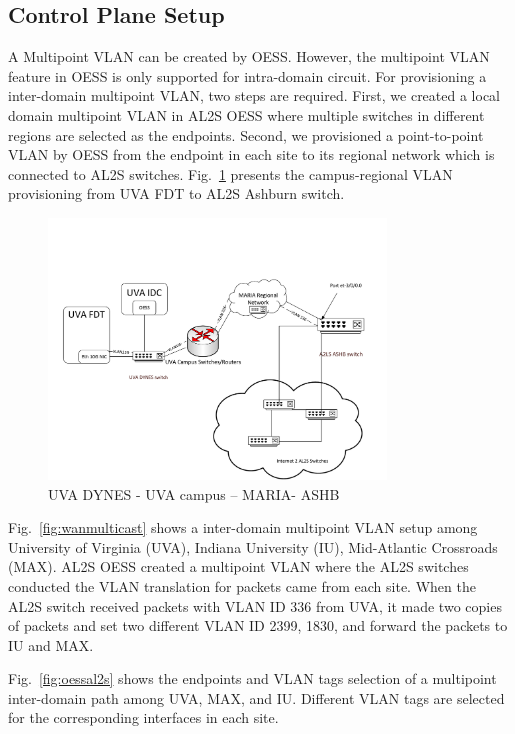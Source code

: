 \subsection{Control Plane Setup}
\label{sec:controlplanefinal}
A Multipoint VLAN can be created by OESS. However, the multipoint VLAN feature in OESS is only supported for intra-domain circuit. For provisioning a inter-domain multipoint VLAN, two steps are required. First, we created a local domain multipoint VLAN in AL2S OESS where multiple switches in different regions are selected as the endpoints. Second, we provisioned a point-to-point VLAN by OESS from the endpoint in each site to its regional network which is connected to AL2S switches. Fig.~\ref{fig:campus-regional} presents the campus-regional VLAN provisioning from UVA FDT to AL2S Ashburn switch.
\begin{figure}[htb!]
\centering
\includegraphics[width=0.8\textwidth]{figures/UVA-ASHB.pdf}
\caption{UVA DYNES - UVA campus – MARIA- ASHB}
\label{fig:campus-regional}
\end{figure}
Fig.~\ref{fig:wanmulticast} shows a inter-domain multipoint VLAN setup among University of Virginia (UVA), Indiana University (IU), Mid-Atlantic Crossroads (MAX). AL2S OESS created a multipoint VLAN where the AL2S switches conducted the VLAN translation for packets came from each site. When the AL2S switch received packets with VLAN ID 336 from UVA, it made two copies of packets and set two different VLAN ID 2399, 1830, and forward the packets to IU and MAX.

Fig.~\ref{fig:oessal2s} shows the endpoints and VLAN tags selection of a multipoint inter-domain path among UVA, MAX, and IU. Different VLAN tags are selected for the corresponding interfaces in each site.

